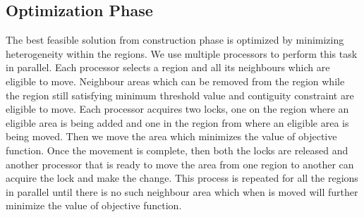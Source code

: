 \documentclass[conference]{IEEEtran}
\begin{document}
\subsection{Optimization Phase}
The best feasible solution from construction phase is optimized
by minimizing heterogeneity within the regions. We use multiple processors to
perform this task in parallel. Each processor selects a region and all its
neighbours which are eligible to move. Neighbour areas which can be removed from
the region while the region still satisfying minimum threshold value and
contiguity constraint are eligible to move. Each processor acquires two locks,
one on the region where an eligible area is being added and one in the region from
where an eligible area is being moved. Then we move the area which minimizes the
value of objective function. Once the movement is complete, then both the locks
are released and another processor that is ready to move the area from one
region to another can acquire the lock and make the change. This process is
repeated for all the regions in parallel until there is no such neighbour area
which when is moved will further minimize the value of objective function.
\end{document}
